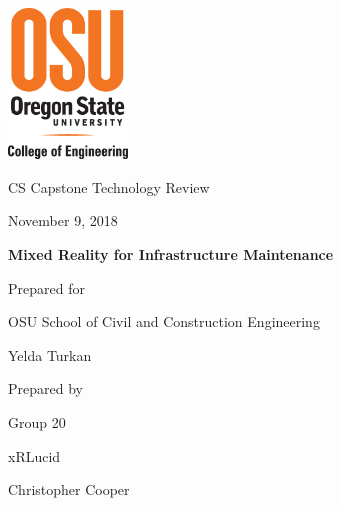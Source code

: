\documentclass[10pt,draftclsnofoot,onecolumn,letterpaper]{IEEEtran}
\def \CapstoneTeamName{		xRLucid}
\def \CapstoneTeamNumber{		20}
\def \GroupMemberOne{			Christopher Cooper}
\def \GroupMemberTwo{			Austin Liang}
\def \GroupMemberThree{			David Okubo}
\def \GroupMemberFour{			Jonathan Chen}
\def \GroupMemberFive{			Mingyu Zhang}
\def \CapstoneProjectName{		Mixed Reality for Infrastructure Maintenance}
\def \CapstoneSponsorCompany{	OSU School of Civil and Construction Engineering}
\def \CapstoneSponsorPerson{		Yelda Turkan}
\def \DocType{	%
				Technology Review
				}
\newcommand{\NameSigPair}[1]{\par
\makebox[2.75in][r]{#1} \hfil 	\makebox[3.25in]{\makebox[2.25in]{\hrulefill} \hfill		\makebox[.75in]{\hrulefill}}
\par\vspace{-12pt} \textit{\tiny\noindent
\makebox[2.75in]{} \hfil		\makebox[3.25in]{\makebox[2.25in][r]{Signature} \hfill	\makebox[.75in][r]{Date}}}}
\renewcommand{\NameSigPair}[1]{#1}
\begin{document}
\begin{titlepage}
    \begin{singlespace}
    	\includegraphics[height=4cm]{coe_v_spot1}
        \hfill
        \par\vspace{.2in}
        \centering
        \scshape{
            \huge CS Capstone \DocType \par
            {\large November 9, 2018}\par
            \vspace{.5in}
            \textbf{\Huge\CapstoneProjectName}\par
            \vfill
            {\large Prepared for}\par
            \Huge \CapstoneSponsorCompany\par
            \vspace{5pt}
            {\Large\NameSigPair{\CapstoneSponsorPerson}\par}
            {\large Prepared by }\par
            Group\CapstoneTeamNumber\par
            \CapstoneTeamName\par
            \vspace{5pt}
            {\Large
                \NameSigPair{\GroupMemberOne}\par
            }
            \vspace{20pt}
        }


\end{singlespace}
\end{titlepage}
\end{document}
